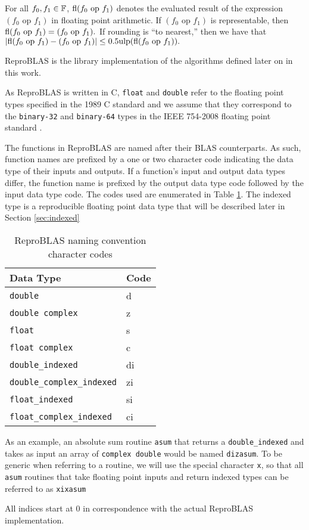   For all $f_0, f_1 \in \mathbb{F}$, $\text{fl}(f_0 \text{ op } f_1)$ denotes the evaluated
  result of the expression $(f_0 \text{ op } f_1)$ in floating point
  arithmetic. If $(f_0 \text{ op } f_1)$ is representable, then
  \(
    \text{fl}(f_0 \text{ op } f_1) = (f_0 \text{ op } f_1).
  \)
  If rounding is ``to nearest,'' then we have that
  \(
    |\text{fl}(f_0 \text{ op } f_1) - (f_0 \text{ op } f_1)| \leq 0.5\text{ulp}(\text{fl}(f_0 \text{ op } f_1)).
  \)

  ReproBLAS is the library implementation of the algorithms defined later on in this work.

  As ReproBLAS is written in C, \texttt{float} and \texttt{double} refer to the
  floating point types specified in the 1989 C standard \cite{c89} and we
  assume that they correspond to the \texttt{binary-32} and \texttt{binary-64}
  types in the IEEE 754-2008 floating point standard \cite{ieee754}.

  The functions in ReproBLAS are named after their BLAS counterparts.
  As such, function names are prefixed by a one or two character code indicating the data type of their inputs and outputs. If a function's input and output data types differ, the function name is prefixed by the output data type code followed by the input data type code.
  The codes used are enumerated in Table \ref{tbl:blas_naming_codes}. The indexed type is a reproducible floating point data type that will be described later in Section \ref{sec:indexed}
  \begin{table}[!htbp]
    \caption{ReproBLAS naming convention character codes}
    \label{tbl:blas_naming_codes}
        \centering
        \begin{tabular}{ | l | l | } \hline
            Data Type & Code \\ \hline
            \texttt{double} & d \\ \hline
            \texttt{double complex} & z \\ \hline
            \texttt{float} & s \\ \hline
            \texttt{float complex} & c \\ \hline
            \texttt{double\_indexed} & di \\ \hline
            \texttt{double\_complex\_indexed} & zi \\ \hline
            \texttt{float\_indexed} & si \\ \hline
            \texttt{float\_complex\_indexed} & ci \\ \hline
        \end{tabular}
  \end{table}
  As an example, an absolute sum routine \texttt{asum} that returns a \texttt{double\_indexed} and takes as input an array of \texttt{complex double} would be named \texttt{dizasum}. To be generic when referring to a routine, we will use the special character \texttt{x}, so that all \texttt{asum} routines that take floating point inputs and return indexed types can be referred to as \texttt{xixasum}

  All indices start at $0$ in correspondence with the actual ReproBLAS implementation.
